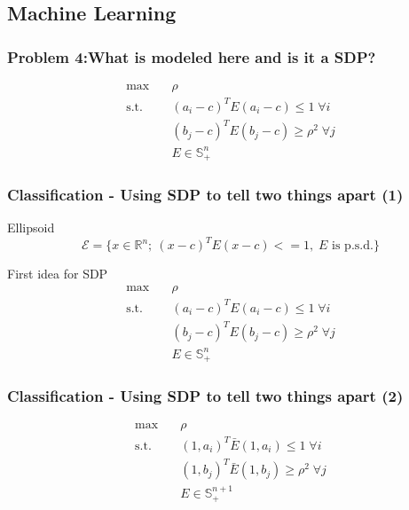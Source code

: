 \documentclass[11pt]{beamer}
\begin{document}
\subsection{Machine Learning}
\begin{frame}
	\frametitle{Problem 4:\newline What is modeled here and is it a SDP?}
	\begin{block}{\vspace*{-3ex}}
		\begin{equation*}
		\begin{aligned}
		\max\quad& \rho\\
		\text{s.t.}\quad&(a_i-c)^TE(a_i-c)\leq 1\;\forall i\\
		&(b_j-c)^TE(b_j-c)\geq \rho^2\;\forall j\\
		& E\in\mathbb{S}^n_+
		\end{aligned}
		\end{equation*}
	\end{block}
\end{frame}
\begin{frame}
	\frametitle{Classification - Using SDP to tell two things apart (1)}
	\begin{block}{Ellipsoid}
		\begin{equation*}
			\mathcal{E}=\{x\in\mathbb{R}^n;\:(x-c)^TE(x-c)<=1,\;E \text{ is p.s.d.}\}
		\end{equation*}
	\end{block}
	\begin{block}{First idea for SDP}
		\begin{equation*}
		\begin{aligned}
		\max\quad& \rho\\
		\text{s.t.}\quad&(a_i-c)^TE(a_i-c)\leq 1\;\forall i\\
		&(b_j-c)^TE(b_j-c)\geq \rho^2\;\forall j\\
		& E\in\mathbb{S}^n_+
		\end{aligned}
		\end{equation*}
	\end{block}
\end{frame}
\begin{frame}
	\frametitle{Classification - Using SDP to tell two things apart (2)}
	\begin{equation*}
	\begin{aligned}
	\max\quad& \rho\\
	\text{s.t.}\quad&(1,a_i)^T\bar{E}(1,a_i)\leq 1\;\forall i\\
	&(1,b_j)^T\bar{E}(1,b_j)\geq \rho^2\;\forall j\\
	& E\in\mathbb{S}^{n+1}_+
	\end{aligned}
	\end{equation*}
\end{frame}
\end{document}
